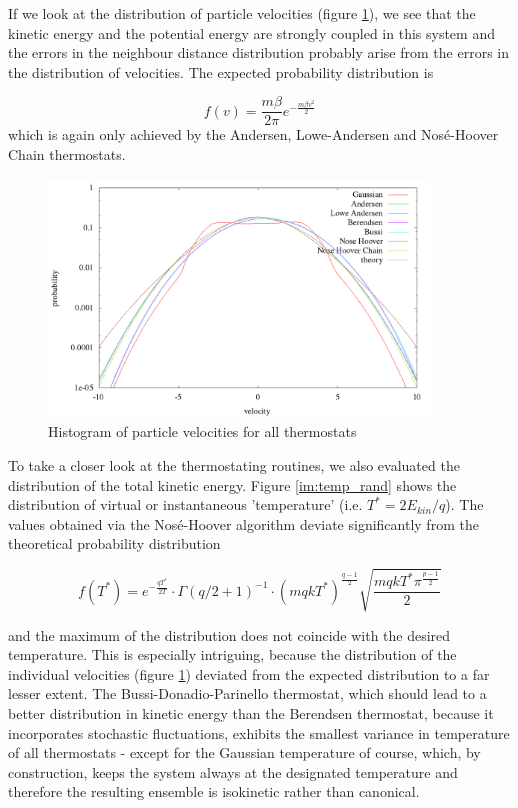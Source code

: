If we look at the distribution of particle velocities (figure \ref{im:vel_rand}), we see that the kinetic energy and the potential energy are strongly coupled in this system and the errors in the neighbour distance distribution probably arise from the errors in the distribution of velocities. The expected probability distribution is

\begin{equation}
f(v) = \frac{m\beta}{2\pi}e^{-\frac{m\beta v^2}{2}}
\end{equation} 
which is again only achieved by the Andersen, Lowe-Andersen and Nosé-Hoover Chain thermostats. 

\begin{figure}[H]
\centering
\includegraphics[width=0.9\textwidth]{./graphics/Histogramm_velocity_rand_T=20_p=64.png}
\caption{Histogram of particle velocities for all thermostats}
\label{im:vel_rand}
\end{figure}

To take a closer look at the thermostating routines, we also evaluated the distribution of the total kinetic energy. Figure \ref{im:temp_rand} shows the distribution of virtual or instantaneous 'temperature' (i.e. $T^* = 2E_{kin}/q$). The values obtained via the Nosé-Hoover algorithm deviate significantly from the theoretical probability distribution

\begin{equation}
f(T^*) = e^{-\frac{qT^{*}}{2T}}\cdot \Gamma(q/2+1)^{-1}\cdot (mqkT^{*})^{\frac{q-1}{2}} \sqrt{\frac{mqkT^{*}\pi^{\frac{p-1}{2}}}{2}} 
\end{equation}

and the maximum of the distribution does not coincide with the desired temperature. This is especially intriguing, because the distribution of the individual velocities (figure \ref{im:vel_rand}) deviated from the expected distribution to a far lesser extent. 
The Bussi-Donadio-Parinello thermostat, which should lead to a better distribution in kinetic energy than the Berendsen thermostat, because it incorporates stochastic fluctuations, exhibits the smallest variance in temperature of all thermostats - except for the Gaussian temperature of course, which, by construction, keeps the system always at the designated temperature and therefore the resulting ensemble is isokinetic rather than canonical.  

